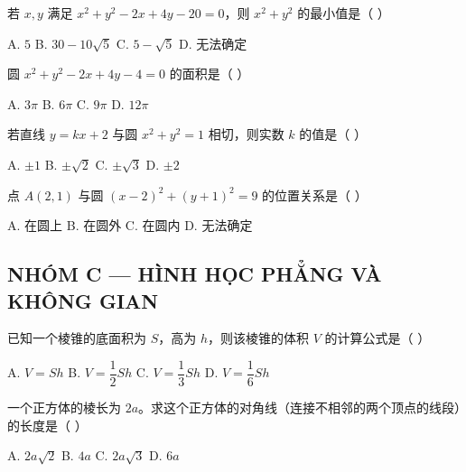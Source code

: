 \documentclass[11pt, a4paper]{article}
\begin{document}
\begin{baitap}[10]
若 $x, y$ 满足 $x^2 + y^2 - 2x + 4y - 20 = 0$，则 $x^2 + y^2$ 的最小值是（ ）
\par\vspace{3pt}
\noindent A. $5$ \quad B. $30 - 10\sqrt{5}$ \quad C. $5 - \sqrt{5}$ \quad D. 无法确定
\end{baitap}

\begin{baitap}[11]
圆 $x^2 + y^2 - 2x + 4y - 4 = 0$ 的面积是（ ）
\par\vspace{3pt}
\noindent A. $3\pi$ \quad B. $6\pi$ \quad C. $9\pi$ \quad D. $12\pi$
\end{baitap}

\begin{baitap}[12]
若直线 $y = kx + 2$ 与圆 $x^2 + y^2 = 1$ 相切，则实数 $k$ 的值是（ ）
\par\vspace{3pt}
\noindent A. $\pm 1$ \quad B. $\pm\sqrt{2}$ \quad C. $\pm\sqrt{3}$ \quad D. $\pm 2$
\end{baitap}

\begin{baitap}[13]
点 $A(2,1)$ 与圆 $(x-2)^2 + (y+1)^2 = 9$ 的位置关系是（ ）
\par\vspace{3pt}
\noindent A. 在圆上 \quad B. 在圆外 \quad C. 在圆内 \quad D. 无法确定
\end{baitap}

\subsection*{NHÓM C — HÌNH HỌC PHẲNG VÀ KHÔNG GIAN}

\begin{baitap}[14]
已知一个棱锥的底面积为 $S$，高为 $h$，则该棱锥的体积 $V$ 的计算公式是（ ）
\par\vspace{3pt}
\noindent A. $V = Sh$ \quad B. $V = \dfrac{1}{2}Sh$ \quad C. $V = \dfrac{1}{3}Sh$ \quad D. $V = \dfrac{1}{6}Sh$
\end{baitap}

\begin{baitap}[15]
一个正方体的棱长为 $2a$。求这个正方体的对角线（连接不相邻的两个顶点的线段）的长度是（ ）
\par\vspace{3pt}
\noindent A. $2a\sqrt{2}$ \quad B. $4a$ \quad C. $2a\sqrt{3}$ \quad D. $6a$
\end{baitap}
\end{document}
